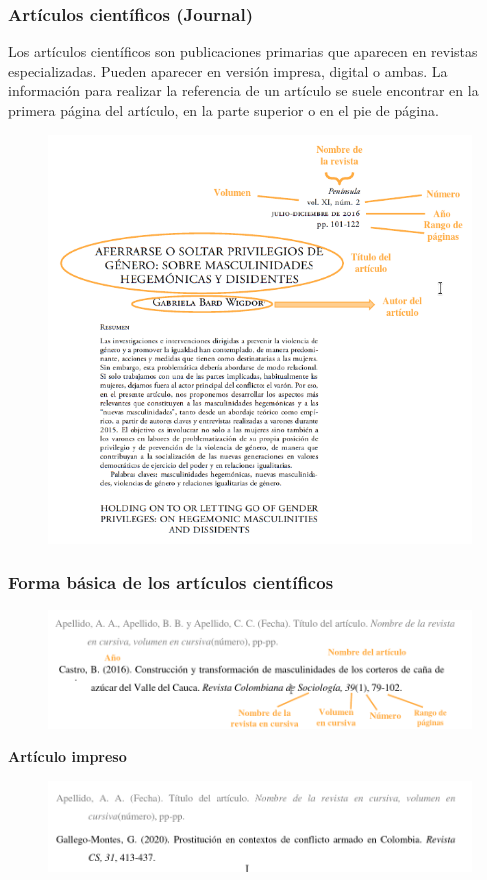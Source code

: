 \documentclass[
11pt, %
]{beamer}
\begin{document}
\begin{frame}
	\frametitle{Artículos científicos (Journal)}

	Los artículos científicos son publicaciones primarias que aparecen en revistas especializadas.
	Pueden aparecer en versión impresa, digital o ambas. La información para realizar la referencia de un
	artículo se suele encontrar en la primera página del artículo, en la parte superior o en el pie de página.

	\begin{exampleblock}{}
		\begin{figure}
			\centering
			\includegraphics[width=0.5\linewidth]{images/screenshot013}
			\label{fig:screenshot010}
		\end{figure}
	\end{exampleblock}

\end{frame}

\begin{frame}
	\frametitle{Forma básica de los artículos científicos}

	\begin{exampleblock}{}
		\begin{figure}
			\centering
			\includegraphics[width=1\linewidth]{images/screenshot014}
			\label{fig:screenshot010}
		\end{figure}
	\end{exampleblock}

	\textbf{Artículo impreso}

	\begin{exampleblock}{}
		\begin{figure}
			\centering
			\includegraphics[width=1\linewidth]{images/screenshot015}
			\label{fig:screenshot010}
		\end{figure}
	\end{exampleblock}

\end{frame}
\end{document}
